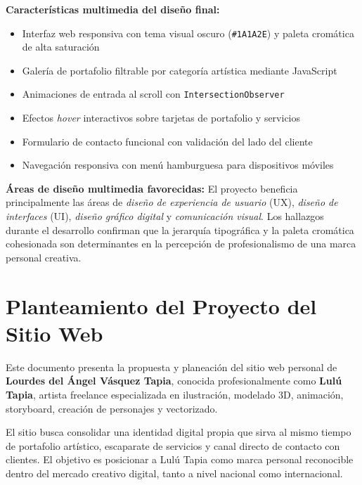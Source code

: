 \documentclass[12pt, letterpaper]{article}
\begin{document}
\textbf{Características multimedia del diseño final:}
\begin{itemize}
  \item Interfaz web responsiva con tema visual oscuro (\texttt{\#1A1A2E}) y paleta cromática de alta saturación
  \item Galería de portafolio filtrable por categoría artística mediante JavaScript
  \item Animaciones de entrada al scroll con \texttt{IntersectionObserver}
  \item Efectos \textit{hover} interactivos sobre tarjetas de portafolio y servicios
  \item Formulario de contacto funcional con validación del lado del cliente
  \item Navegación responsiva con menú hamburguesa para dispositivos móviles

\end{itemize}

\textbf{Áreas de diseño multimedia favorecidas:} El proyecto beneficia principalmente las áreas de \textit{diseño de experiencia de usuario} (UX), \textit{diseño de interfaces} (UI), \textit{diseño gráfico digital} y \textit{comunicación visual}. Los hallazgos durante el desarrollo confirman que la jerarquía tipográfica y la paleta cromática cohesionada son determinantes en la percepción de profesionalismo de una marca personal creativa.

\newpage


\section{Planteamiento del Proyecto del Sitio Web}

Este documento presenta la propuesta y planeación del sitio web personal de \textbf{Lourdes del Ángel Vásquez Tapia}, conocida profesionalmente como \textbf{Lulú Tapia}, artista freelance especializada en ilustración, modelado 3D, animación, storyboard, creación de personajes y vectorizado.

El sitio busca consolidar una identidad digital propia que sirva al mismo tiempo de portafolio artístico, escaparate de servicios y canal directo de contacto con clientes. El objetivo es posicionar a Lulú Tapia como marca personal reconocible dentro del mercado creativo digital, tanto a nivel nacional como internacional.
\end{document}

